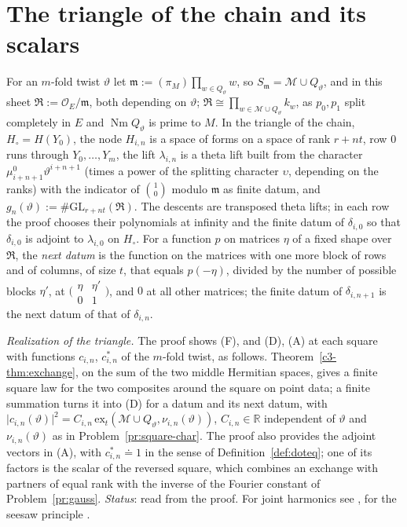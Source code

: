 \documentclass[reqno]{amsart}
\theoremstyle{definition}
\theoremstyle{plain}
\newcommand{\R}{\mathbb R}
\newcommand{\Nm}{\operatorname{Nm}}
\newcommand{\cM}{\mathcal M}
\newcommand{\Oc}{\mathcal O}
\newcommand{\GL}{\mathrm{GL}}
\newcommand{\ex}{\mathrm{ex}}
\newcommand{\Hc}{H_\circ}
\begin{document}
\section{The triangle of the chain and its scalars}\label{sec:scalars}

For an \(m\)-fold twist \(\vartheta\) let \(\mathfrak m := (\pi_M)\prod_{w \in Q_\vartheta} w\), so \(S_{\mathfrak m} = \cM \cup Q_\vartheta\), and in this sheet \(\mathfrak R := \Oc_E/\mathfrak m\), both depending on \(\vartheta\); \(\mathfrak R \cong \prod_{w \in \cM \cup Q_\vartheta} k_w\), as \(p_0, p_1\) split completely in \(E\) and \(\Nm Q_\vartheta\) is prime to \(M\).  In the triangle of the chain, \(\Hc = H(Y_0)\), the node \(H_{i,n}\) is a space of forms on a space of rank \(r + nt\), row \(0\) runs through \(Y_0, \dots, Y_m\), the lift \(\lambda_{i,n}\) is a theta lift built from the character \(\mu^0_{i+n+1}\vartheta^{i+n+1}\) (times a power of the splitting character \(\upsilon\), depending on the ranks) with the indicator of \(\binom{1}{0}\) modulo \(\mathfrak m\) as finite datum, and \(g_n(\vartheta) := \#\GL_{r+nt}(\mathfrak R)\).  The descents are transposed theta lifts; in each row the proof chooses their polynomials at infinity and the finite datum of \(\delta_{i,0}\) so that \(\delta_{i,0}\) is adjoint to \(\lambda_{i,0}\) on \(\Hc\).  For a function \(p\) on matrices \(\eta\) of a fixed shape over \(\mathfrak R\), the \emph{next datum} is the function on the matrices with one more block of rows and of columns, of size \(t\), that equals \(p(-\eta)\), divided by the number of possible blocks \(\eta'\), at \(\bigl(\begin{smallmatrix}\eta & \eta'\\ 0 & 1\end{smallmatrix}\bigr)\), and \(0\) at all other matrices; the finite datum of \(\delta_{i,n+1}\) is the next datum of that of \(\delta_{i,n}\).

\emph{Realization of the triangle.}  The proof shows (F), and (D), (A) at each square with functions \(c_{i,n}\), \(c^*_{i,n}\) of the \(m\)-fold twist, as follows.  Theorem~\ref{c3-thm:exchange}, on the sum of the two middle Hermitian spaces, gives a finite square law for the two composites around the square on point data; a finite summation turns it into (D) for a datum and its next datum, with \(\lvert c_{i,n}(\vartheta)\rvert^2 = C_{i,n}\,\ex_t(\cM \cup Q_\vartheta, \nu_{i,n}(\vartheta))\), \(C_{i,n} \in \R\) independent of \(\vartheta\) and \(\nu_{i,n}(\vartheta)\) as in Problem~\ref{pr:square-char}.  The proof also provides the adjoint vectors in (A), with \(c^*_{i,n} \doteq 1\) in the sense of Definition~\ref{def:doteq}; one of its factors is the scalar of the reversed square, which combines an exchange with partners of equal rank with the inverse of the Fourier constant of Problem~\ref{pr:gauss}.  \emph{Status}: read from the proof.  For joint harmonics see \cite{Li90, Ho89}, for the seesaw principle \cite{Ku84}.
\end{document}
